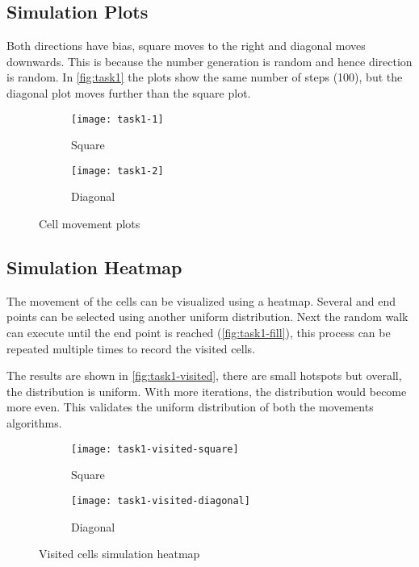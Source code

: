 
\subsection{Simulation Plots}

Both directions have bias, square moves to the right and diagonal moves downwards.
This is because the number generation is random and hence direction is random.
In \autoref{fig:task1} the plots show the same number of steps (100), but the diagonal plot moves further than the square plot.

\begin{figure}[!ht]
    \centering
    \begin{subfigure}{0.4\textwidth}
    	\texttt{[image: task1-1]}
    	\caption[Square]{Square}
    	\label{fig:task1-1}
    \end{subfigure}
    \begin{subfigure}{0.4\textwidth}
    	\texttt{[image: task1-2]}
    	\caption[Diagonal]{Diagonal}
    	\label{fig:task1-2}
	\end{subfigure}
	\caption[Cell movement plots]{Cell movement plots}
    \label{fig:task1}
\end{figure}

\clearpage

\subsection{Simulation Heatmap}

The movement of the cells can be visualized using a heatmap.
Several and end points can be selected using another uniform distribution.
Next the random walk can execute until the end point is reached (\autoref{fig:task1-fill}),
this process can be repeated multiple times to record the visited cells.


The results are shown in \autoref{fig:task1-visited}, there are small hotspots but overall, the distribution is uniform.
With more iterations, the distribution would become more even.
This validates the uniform distribution of both the movements algorithms.

\begin{figure}[ht]
    \centering
    \begin{subfigure}{0.45\textwidth}
        \texttt{[image: task1-visited-square]}
        \caption[Square]{Square}
        \label{fig:task1-visited-square}
    \end{subfigure}
    \begin{subfigure}{0.45\textwidth}
        \texttt{[image: task1-visited-diagonal]}
        \caption[Diagonal]{Diagonal}
        \label{fig:task1-visited-diagonal}
    \end{subfigure}
    \caption[Visited cells simulation heatmap]{Visited cells simulation heatmap}
    \label{fig:task1-visited}
\end{figure}

